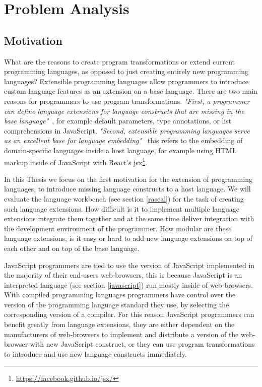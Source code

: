 
\chapter{Problem Analysis} %

\label{Chapter2}


\section{Motivation}
What are the reasons to create program transformations or extend current programming languages, as opposed to just creating entirely new programming languages? Extensible programming languages allow programmers to introduce custom language features as an extension on a base language.  There are two main reasons for programmers to use program transformations. \textit{"First, a programmer can define language extensions for language constructs that are missing in the base language"}~\cite{Erdweg2014a}, for example default parameters, type annotations, or list comprehensions in JavaScript. \textit{"Second, extensible programming languages serve as an excellent base for language embedding"}~\cite{Erdweg2014a} this refers to the embedding of domain-specific languages inside a host language, for example using HTML markup inside of JavaScript with React's jsx\footnote{\url{https://facebook.github.io/jsx/}}.

In this Thesis we focus on the first motivation for the extension of programming languages, to introduce missing language constructs to a host language. We will evaluate the language workbench (see section \ref{rascal}) for the task of creating such language extensions. How difficult is it to implement multiple language extensions integrate them together and at the same time deliver integration with the development environment of the programmer. How modular are these language extensions, is it easy or hard to add new language extensions on top of each other and on top of the base language.

JavaScript programmers are tied to use the version of JavaScript implemented in the majority of their end-users web-browsers, this is because JavaScript is an interpreted language (see section \ref{javascript}) run mostly inside of web-browsers. With compiled programming languages programmers have control over the version of the programming language standard they use, by selecting the corresponding version of a compiler. For this reason JavaScript programmers can benefit greatly from language extensions, they are either dependent on the manufacturers of web-browsers to implement and distribute a version of the web-browser with new JavaScript construct, or they can use program transformations to introduce and use new language constructs immediately.


